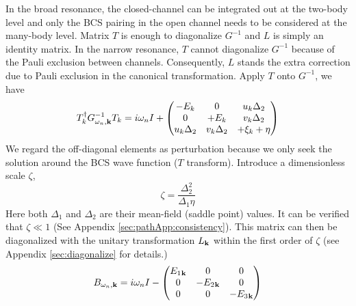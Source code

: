 In the broad resonance, the closed-channel can be integrated out at the two-body level and  only the BCS pairing in the open channel needs to be considered at the many-body level. Matrix $T$ is enough to diagonalize $G^{-1}$ and $L$ is simply an identity matrix.  %
In the narrow resonance, $T$ cannot diagonalize $G^{-1}$ because of the Pauli exclusion between channels.  Consequently, $L$ stands the extra correction due to Pauli exclusion in the canonical transformation. Apply $T$ onto $G^{-1}$, we have 
\begin{equation}\label{eq:pathInt2:G2}
T_k^{\dagger}G_{\omega_{n},\mathbf{k}}^{-1}T_k=i\omega_nI+\begin{pmatrix}-E_k&0&u_k\Delta_2\\0&+E_k&v_k\Delta_2\\u_k\Delta_2&v_k\Delta_2&+\xi_k+\eta\end{pmatrix}
\end{equation}
We regard the off-diagonal elements as perturbation because  we  only seek the solution around the BCS wave function ($T$ transform). 
Introduce a dimensionless scale $\zeta$,
\begin{equation}\label{eq:pathInt2:zetaDef}
\boxed{\zeta=\frac{\Delta_{2}^{2}}{\Delta_{1}\eta}}
\end{equation}
Here both $\Delta_{1}$ and $\Delta_{2}$ are their mean-field (saddle point) values.  It can be verified that $\zeta\ll1$ (See Appendix \ref{sec:pathApp:consistency}).  
This matrix can then be diagonalized with  the unitary transformation $L_{\mathbf{k}}$ within the first order of $\zeta$  (see Appendix \ref{sec:diagonalize} for details.)
\begin{equation}\label{eq:pathInt2:Bapprox}
\begin{split}
B_{\omega_{n},\mathbf{k}}&=i\omega_{n}I-
	\begin{pmatrix}E_{1}{}_{\mathbf{k}}&0&0\\0&-E_{2}{}_{\mathbf{k}}&0\\0&0&-E_{3}{}_{\mathbf{k}}\end{pmatrix}\\
\end{split}	
\end{equation}
